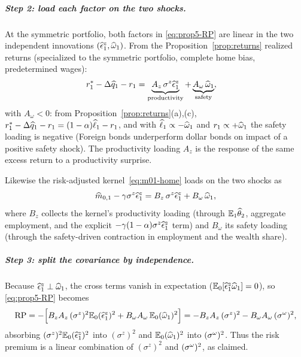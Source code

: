 \subparagraph{Step 2: load each factor on the two shocks.} At the symmetric
portfolio, both factors in \eqref{eq:prop5-RP} are linear in the two independent
innovations $(\widehat{\epsilon}^z_1,\widehat{\omega}_1)$. From the
Proposition~\ref{prop:returns} realized returns (specialized to the symmetric
portfolio, complete home bias, predetermined wages):
\begin{align}
r^{*}_1-\Delta\widehat{q}_1-r_1
&= \underbrace{A_z\,\sigma^z\widehat{\epsilon}^z_1}_{\text{productivity}}
+\underbrace{A_\omega\,\widehat{\omega}_1}_{\text{safety}}, \label{eq:exret-decomp}
\end{align}
with $A_\omega<0$: from Proposition~\ref{prop:returns}(a),(c),
$r^{*}_1-\Delta\widehat{q}_1-r_1=(1-\alpha)\widehat{\ell}_1-r_1$, and with
$\widehat{\ell}_1\propto-\widehat{\omega}_1$ and $r_1\propto+\widehat{\omega}_1$ the safety
loading is negative (Foreign bonds underperform dollar bonds on impact of a
positive safety shock). The productivity loading $A_z$ is the response of the same
excess return to a productivity surprise.

Likewise the risk-adjusted kernel~\eqref{eq:m01-home} loads on the two shocks as
\begin{equation}
\widehat{m}_{0,1}-\gamma\sigma^z\widehat{\epsilon}^z_1
= B_z\,\sigma^z\widehat{\epsilon}^z_1 + B_\omega\,\widehat{\omega}_1, \label{eq:kernel-decomp}
\end{equation}
where $B_z$ collects the kernel's productivity loading (through
$\mathbb{E}_1\widehat{\theta}_2$, aggregate employment, and the explicit
$-\gamma(1-\alpha)\sigma^z\widehat{\epsilon}^z_1$ term) and $B_\omega$ its safety loading
(through the safety-driven contraction in employment and the wealth share).

\subparagraph{Step 3: split the covariance by independence.} Because
$\widehat{\epsilon}^z_1\perp\widehat{\omega}_1$, the cross terms vanish in expectation
($\mathbb{E}_0[\widehat{\epsilon}^z_1\widehat{\omega}_1]=0$), so \eqref{eq:prop5-RP} becomes
\begin{equation}
\text{RP} = -\Bigl[B_z A_z\,(\sigma^z)^2\mathbb{E}_0(\widehat{\epsilon}^z_1)^2
+ B_\omega A_\omega\,\mathbb{E}_0(\widehat{\omega}_1)^2\Bigr]
= -B_z A_z\,(\sigma^z)^2 - B_\omega A_\omega\,(\sigma^{\omega})^2, \label{eq:RP-split}
\end{equation}
absorbing $(\sigma^z)^2\mathbb{E}_0(\widehat{\epsilon}^z_1)^2$ into $(\sigma^z)^2$ and
$\mathbb{E}_0(\widehat{\omega}_1)^2$ into $(\sigma^{\omega})^2$. Thus the risk premium is a linear
combination of $(\sigma^z)^2$ and $(\sigma^{\omega})^2$, as claimed.

